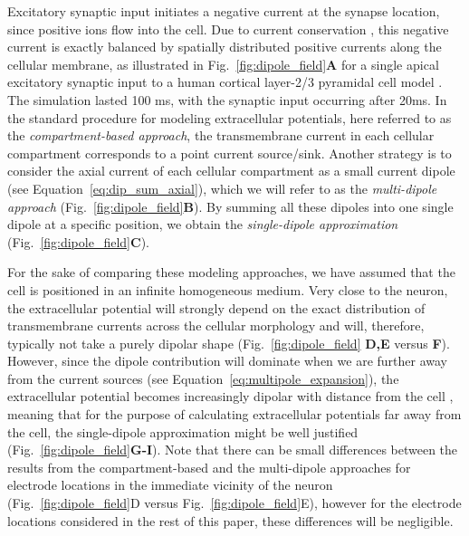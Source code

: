 \documentclass[preprint,10pt,authoryear]{elsarticle}
\newcommand{\hlb}[2][NavyBlue]{ {\sethlcolor{#1} \hl{#2}} }
\newcommand{\hlg}[2][Emerald]{ {\sethlcolor{#1} \hl{#2}} }
\newcommand{\snnote}[1]{\color{white}{\hlb{SN: #1 }}\color{black}}
\newcommand{\sntxt}[1]{{\color{NavyBlue}#1}}
\newcommand{\tvnnote}[1]{\color{white}{\hlg{TVN: #1 }}\color{black}}
\begin{document}
Excitatory synaptic input initiates a negative current at the synapse location, since positive ions flow into the cell. Due to current conservation \citep{NUNEZ2006}, this negative current is exactly balanced by spatially distributed positive currents along the cellular membrane, as illustrated in Fig.~\ref{fig:dipole_field}\textbf{A} for a single apical excitatory synaptic input to a human cortical layer-2/3 pyramidal cell model \citep{EYAL2016}. \sntxt{The simulation lasted 100 ms, with the synaptic input occurring after 20ms.}
In the standard procedure for modeling extracellular potentials, here referred to as the {\it compartment-based approach}, the transmembrane current in each cellular compartment corresponds to a point current source/sink. Another strategy is to consider the axial current of each cellular compartment as a small current dipole (see Equation~\eqref{eq:dip_sum_axial}), which we will refer to as the {\it multi-dipole approach} (Fig.~\ref{fig:dipole_field}\textbf{B}). By summing all these dipoles into one single dipole at a specific position, we obtain the {\it single-dipole approximation} (Fig.~\ref{fig:dipole_field}\textbf{C}).

For the sake of comparing these modeling approaches, we have assumed that the cell is positioned in an infinite homogeneous medium. Very close to the neuron, the extracellular potential will strongly depend on the exact distribution of transmembrane currents across the cellular morphology and  will, therefore, typically not take a  \sntxt{purely} dipolar shape 
(Fig.~\ref{fig:dipole_field} \textbf{D,E} versus \textbf{F}). However, since the dipole contribution will dominate when we are further away from the current sources (see Equation~\ref{eq:multipole_expansion}), the extracellular potential becomes increasingly dipolar with distance from the cell \citep{LINDEN2010}, meaning that for the purpose of calculating extracellular potentials far away from the cell, the single-dipole approximation might be well justified (Fig.~\ref{fig:dipole_field}\textbf{G-I}). Note that there can be small differences between the results from the compartment-based and the multi-dipole approaches for electrode locations in the immediate vicinity of the neuron (Fig.~\ref{fig:dipole_field}D versus Fig.~\ref{fig:dipole_field}E), however for the electrode locations considered in the rest of this paper, these differences will be negligible.
\end{document}
